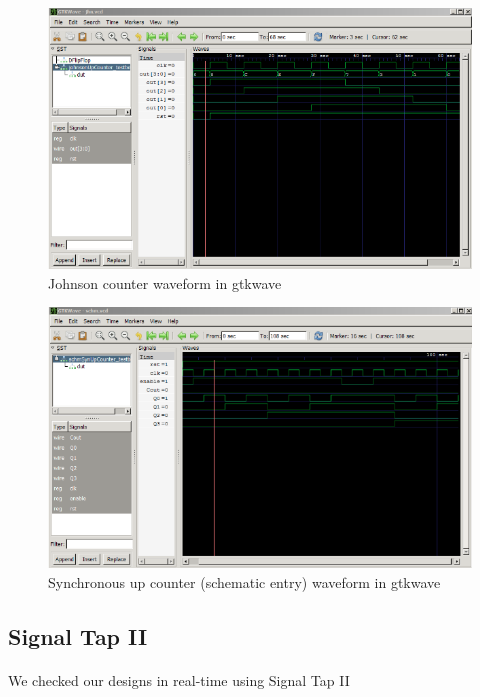 \documentclass{article}
\begin{document}
		\begin{figure}[H]
		  \centering
		  \includegraphics[width=0.75\linewidth]{figures/waveforms/johnson_wave.png}
		  \caption{Johnson counter waveform in gtkwave}
		  \label{fig:johnson_waveform}
		\end{figure}

		\begin{figure}[H]
		  \centering
		  \includegraphics[width=0.75\linewidth]{figures/waveforms/schem_synUp_wave.png}
		  \caption{Synchronous up counter (schematic entry) waveform in gtkwave}
	   	  \label{fig:schem_synUp_waveform}
		\end{figure}


\subsection{Signal Tap II}
	\paragraph{} We checked our designs in real-time using Signal Tap II
\end{document}
